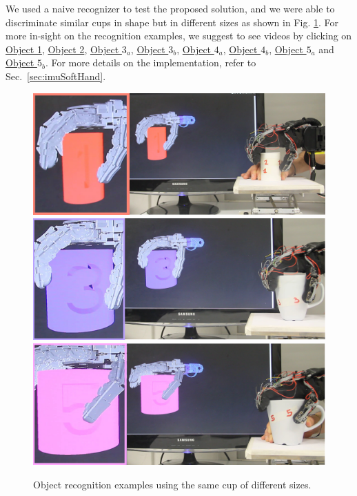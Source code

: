 \documentclass[a4paper,11pt,pdf]{pacmanreport}
\begin{document}
We used a naive recognizer to test the proposed solution, and we were able to discriminate similar cups in shape but in different sizes as shown in Fig. \ref{fig:Object_1}. For more in-sight on the recognition examples, we suggest to see videos by clicking on \href{https://www.youtube.com/watch?v=d_WPQ3WmHRg}{Object 1}, \href{https://www.youtube.com/watch?v=PG38VObdl6o}{Object 2}, \href{https://www.youtube.com/watch?v=bIYhLXm90hc}{Object $3_a$}, \href{https://www.youtube.com/watch?v=IXVlBAoGKho}{Object $3_b$}, \href{https://www.youtube.com/watch?v=Efmm6-JHcxU}{Object $4_a$}, \href{https://www.youtube.com/watch?v=NZElSV_AnJ4}{Object $4_b$}, \href{https://www.youtube.com/watch?v=mDDb5oTaHzM}{Object $5_a$} and \href{https://www.youtube.com/watch?v=sLzU39zffFY}{Object $5_b$}. For more details on the implementation, refer to Sec.~\ref{sec:imuSoftHand}.

\begin{figure}
\centering
\includegraphics[width=0.8\linewidth]{Object_1.png}
\includegraphics[width=0.8\linewidth]{Object_3.png}
\includegraphics[width=0.8\linewidth]{Object_5.png}
\caption{Object recognition examples using the same cup of different sizes.}
\label{fig:Object_1}
\end{figure}
\end{document}
